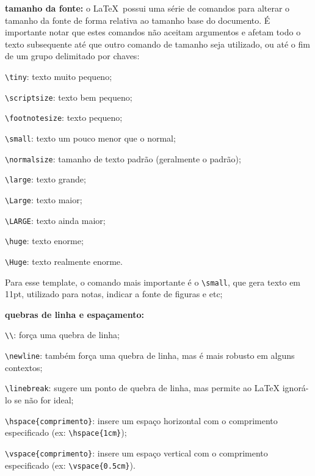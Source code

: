 \begin{alineas}
	\item \textbf{tamanho da fonte:} o \LaTeX\  possui uma série de comandos para alterar o tamanho da fonte de forma relativa ao tamanho base do documento. É importante notar que estes comandos não aceitam argumentos e afetam todo o texto subsequente até que outro comando de tamanho seja utilizado, ou até o fim de um grupo delimitado por chaves:
	\begin{alineas}
		\item \verb|\tiny|: {\tiny texto muito pequeno;}
		\item \verb|\scriptsize|: {\scriptsize texto bem pequeno;}
		\item \verb|\footnotesize|: {\footnotesize texto pequeno;}
		\item \verb|\small|: {\small texto um pouco menor que o normal;}
		\item \verb|\normalsize|: {\normalsize tamanho de texto padrão (geralmente o padrão);}
		\item \verb|\large|: {\large texto grande;}
		\item \verb|\Large|: {\Large texto maior;}
		\item \verb|\LARGE|: {\LARGE texto ainda maior;}
		\item \verb|\huge|: {\huge texto enorme;}
		\item \verb|\Huge|: {\Huge texto realmente enorme.}
	\end{alineas}
	Para esse template, o comando mais importante é o \verb|\small|, que gera texto em 11pt, utilizado para notas, indicar a fonte de figuras e etc;
	
	\item \textbf{quebras de linha e espaçamento:}
	\begin{alineas}
		\item \verb|\\|: força uma quebra de linha;
		\item \verb|\newline|: também força uma quebra de linha, mas é mais robusto em alguns contextos;
		\item \verb|\linebreak|: sugere um ponto de quebra de linha, mas permite ao LaTeX ignorá-lo se não for ideal;
		\item \verb|\hspace{comprimento}|: insere um espaço horizontal com o comprimento especificado (ex: \verb|\hspace{1cm}|);
		\item \verb|\vspace{comprimento}|: insere um espaço vertical com o comprimento especificado (ex: \verb|\vspace{0.5cm}|).
	\end{alineas}
	

\end{alineas}
